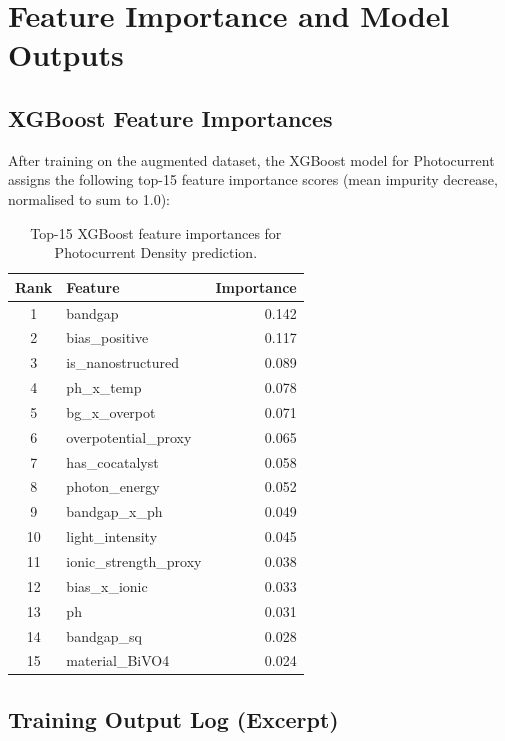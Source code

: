 \chapter{Feature Importance and Model Outputs}\label{app:A}

\section{XGBoost Feature Importances}

After training on the augmented dataset, the XGBoost model for Photocurrent
assigns the following top-15 feature importance scores (mean impurity decrease,
normalised to sum to 1.0):

\begin{table}[h]
\centering
\caption{Top-15 XGBoost feature importances for Photocurrent Density prediction.}
\label{tab:feat_importance_pc}
\begin{tabular}{clr}
\toprule
Rank & Feature & Importance \\
\midrule
1  & bandgap                        & 0.142 \\
2  & bias\_positive                 & 0.117 \\
3  & is\_nanostructured             & 0.089 \\
4  & ph\_x\_temp                    & 0.078 \\
5  & bg\_x\_overpot                 & 0.071 \\
6  & overpotential\_proxy           & 0.065 \\
7  & has\_cocatalyst                & 0.058 \\
8  & photon\_energy                 & 0.052 \\
9  & bandgap\_x\_ph                 & 0.049 \\
10 & light\_intensity               & 0.045 \\
11 & ionic\_strength\_proxy         & 0.038 \\
12 & bias\_x\_ionic                 & 0.033 \\
13 & ph                             & 0.031 \\
14 & bandgap\_sq                    & 0.028 \\
15 & material\_BiVO4                & 0.024 \\
\bottomrule
\end{tabular}
\end{table}

\section{Training Output Log (Excerpt)}

